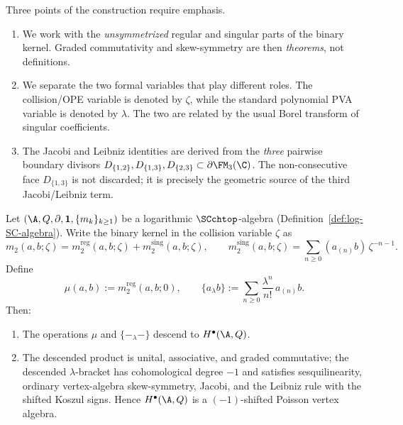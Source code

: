 Three points of the construction require emphasis.

\begin{enumerate}[label=\textup{(\arabic*)}]
\item We work with the \emph{unsymmetrized} regular and singular parts of the binary kernel.
 Graded commutativity and skew-symmetry are then \emph{theorems}, not definitions.
\item We separate the two formal variables that play different roles. The collision/OPE
 variable is denoted by $\zeta$, while the standard polynomial PVA variable is denoted
 by $\lambda$. The two are related by the usual Borel transform of singular coefficients.
\item The Jacobi and Leibniz identities are derived from the \emph{three} pairwise
 boundary divisors $D_{\{1,2\}},D_{\{1,3\}},D_{\{2,3\}}\subset \partial\FM_3(\C)$.
 The non-consecutive face $D_{\{1,3\}}$ is not discarded; it is precisely the geometric
 source of the third Jacobi/Leibniz term.
\end{enumerate}

\begin{maintheorem}
\label{thm:cohomology-PVA-main}%
\label{thm:cohomology_PVA}%
\label{thm:pva-coisson-bridge}%
Let $(\A,Q,\partial,\mathbf 1,\{m_k\}_{k\ge1})$ be a
logarithmic\/ $\SCchtop$-algebra
\textup{(}Definition~\textup{\ref{def:log-SC-algebra})}.
Write the binary kernel in the collision variable $\zeta$ as
\[
m_2(a,b;\zeta)=m_2^{\mathrm{reg}}(a,b;\zeta)+m_2^{\mathrm{sing}}(a,b;\zeta),
\qquad
m_2^{\mathrm{sing}}(a,b;\zeta)=\sum_{n\ge0}(a_{(n)}b)\,\zeta^{-n-1}.
\]
Define
\[
\mu(a,b):=m_2^{\mathrm{reg}}(a,b;0),
\qquad
\{a_\lambda b\}:=\sum_{n\ge0}\frac{\lambda^n}{n!}\,a_{(n)}b.
\]
Then:

\begin{enumerate}[label=\textup{(\roman*)}]
\item The operations $\mu$ and $\{-{}_\lambda-\}$ descend to $H^\bullet(\A,Q)$.
\item The descended product is unital, associative, and graded commutative; the descended
 $\lambda$-bracket has cohomological degree $-1$ and satisfies sesquilinearity,
 ordinary vertex-algebra skew-symmetry, Jacobi, and the Leibniz rule
 with the shifted Koszul signs. Hence
 $H^\bullet(\A,Q)$ is a $(-1)$-shifted Poisson vertex algebra.
\end{enumerate}
\end{maintheorem}

